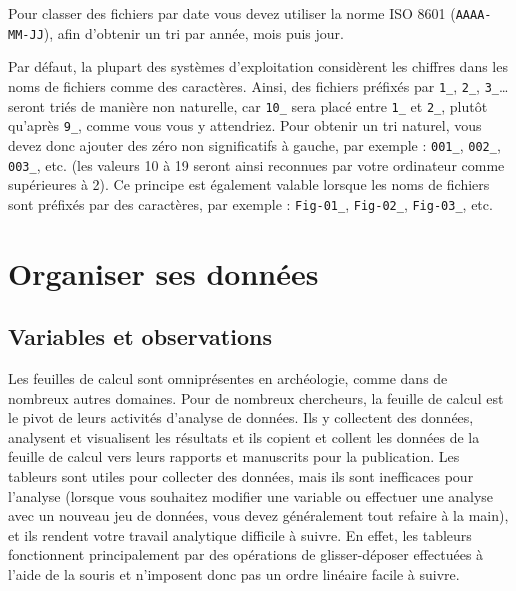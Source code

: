 \documentclass[
  french,
]{scrbook}
\begin{document}
\begin{tcolorbox}[fonttitle=\sffamily\bfseries\large,title=Conseil,colframe=darkcyan]

Pour classer des fichiers par date vous devez utiliser la norme ISO 8601 (\texttt{AAAA-MM-JJ}), afin d'obtenir un tri par année, mois puis jour.

Par défaut, la plupart des systèmes d'exploitation considèrent les chiffres dans les noms de fichiers comme des caractères. Ainsi, des fichiers préfixés par \texttt{1\_}, \texttt{2\_}, \texttt{3\_}\ldots{} seront triés de manière non naturelle, car \texttt{10\_} sera placé entre \texttt{1\_} et \texttt{2\_}, plutôt qu'après \texttt{9\_}, comme vous vous y attendriez. Pour obtenir un tri naturel, vous devez donc ajouter des zéro non significatifs à gauche, par exemple : \texttt{001\_}, \texttt{002\_}, \texttt{003\_}, etc. (les valeurs 10 à 19 seront ainsi reconnues par votre ordinateur comme supérieures à 2). Ce principe est également valable lorsque les noms de fichiers sont préfixés par des caractères, par exemple : \texttt{Fig-01\_}, \texttt{Fig-02\_}, \texttt{Fig-03\_}, etc.

\end{tcolorbox}

\hypertarget{organiser-ses-donnuxe9es}{%
\chapter{Organiser ses données}\label{organiser-ses-donnuxe9es}}

\hypertarget{variables-et-observations}{%
\section{Variables et observations}\label{variables-et-observations}}

Les feuilles de calcul sont omniprésentes en archéologie, comme dans de nombreux autres domaines. Pour de nombreux chercheurs, la feuille de calcul est le pivot de leurs activités d'analyse de données. Ils y collectent des données, analysent et visualisent les résultats et ils copient et collent les données de la feuille de calcul vers leurs rapports et manuscrits pour la publication. Les tableurs sont utiles pour collecter des données, mais ils sont inefficaces pour l'analyse (lorsque vous souhaitez modifier une variable ou effectuer une analyse avec un nouveau jeu de données, vous devez généralement tout refaire à la main), et ils rendent votre travail analytique difficile à suivre. En effet, les tableurs fonctionnent principalement par des opérations de glisser-déposer effectuées à l'aide de la souris et n'imposent donc pas un ordre linéaire facile à suivre.
\end{document}
